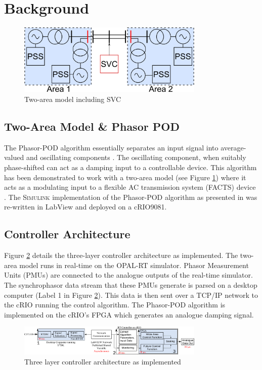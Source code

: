 \documentclass[conference]{IEEEtran}
\begin{document}
\section{Background}\label{background}

\begin{figure}[]
\centering
\includegraphics[width=3.5in]{TwoArea.png} 
\caption{Two-area model including SVC}
\label{TwoArea}
\end{figure}

\subsection{Two-Area Model \& Phasor POD}
The Phasor-POD algorithm essentially separates an input signal into average-valued and oscillating components \cite{PhasorPOD}. The oscillating component, when suitably phase-shifted can act as a damping input to a controllable device. This algorithm has been demonstrated to work with a two-area model (see Figure \ref{TwoArea}) where it acts as a modulating input to a flexible AC transmission system (FACTS) device \cite{PhasorPODImplement}. The \textsc{Simulink} implementation of the Phasor-POD algorithm as presented in \cite{PhasorPODImplement} was re-written in LabView and deployed on a cRIO9081.

\subsection{Controller Architecture}
Figure \ref{FinalArch} details the three-layer controller architecture as implemented. The two-area model runs in real-time on the OPAL-RT simulator. Phasor Measurement Units (PMUs) are connected to the analogue outputs of the real-time simulator. The synchrophasor data stream that these PMUs generate is parsed on a desktop computer (Label 1 in Figure \ref{FinalArch}). This data is then sent over a TCP/IP network to the cRIO running the control algorithm. The Phasor-POD algorithm is implemented on the cRIO's FPGA which generates an analogue damping signal.

\begin{figure}[]
\centering
\includegraphics[width=3.5in]{ArchitectureDevelopment.pdf} 
\caption{Three layer controller architecture as implemented}
\label{FinalArch}
\end{figure}
\end{document}
